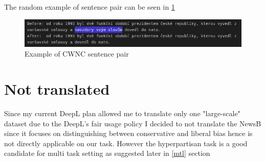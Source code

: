 The random example of sentence pair can be seen in \ref{fig:wiki2cs-example}

\begin{figure}
  \includegraphics[width=\linewidth]{my_modules/multimedia/wiki2example.jpg}
  \caption{Example of CWNC sentence pair}
  \label{fig:wiki2cs-example}
\end{figure}

\section{Not translated}
Since my current DeepL plan allowed me to translate only one "large-scale" dataset due to the DeepL's fair usage policy I decided to not translate the NewsB since it focuses on distinguishing between conservative and liberal bias hence is not directly applicable on our task. However the hyperpartisan task is a good candidate for multi task setting as suggested later in \ref{mtl} section